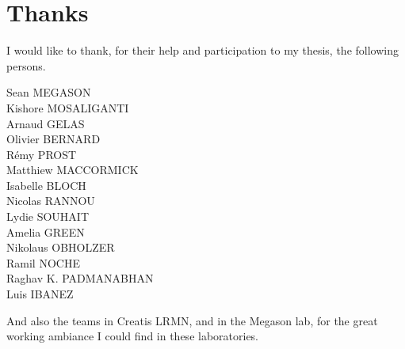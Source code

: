 \chapter*{Thanks}
{}

I would like to thank, for their help and participation to my thesis, the following persons.

\begin{center}
Sean MEGASON\\
Kishore MOSALIGANTI\\
Arnaud GELAS\\
Olivier BERNARD\\
Rémy PROST\\
Matthiew MACCORMICK\\
Isabelle BLOCH\\
Nicolas RANNOU\\
Lydie SOUHAIT\\
Amelia GREEN\\
Nikolaus OBHOLZER\\
Ramil NOCHE\\
Raghav K. PADMANABHAN\\
Luis IBANEZ\\
\end{center}

And also the teams in Creatis LRMN, and in the Megason lab, for the great working ambiance I could find in these laboratories.

\appendix

